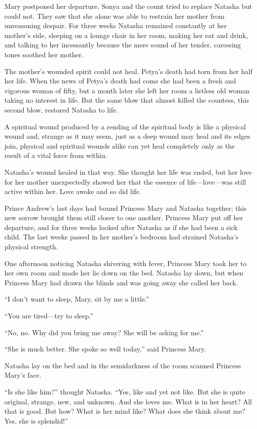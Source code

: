  Mary postponed her departure. Sonya and the count tried
to replace Natasha but could not. They saw that she alone was
able to restrain her mother from unreasoning despair. For three
weeks Natasha remained constantly at her mother's side, sleeping
on a lounge chair in her room, making her eat and drink, and
talking to her incessantly because the mere sound of her tender,
caressing tones soothed her mother.

The mother's wounded spirit could not heal. Petya's death had
torn from her half her life. When the news of Petya's death had
come she had been a fresh and vigorous woman of fifty, but a
month later she left her room a listless old woman taking no
interest in life. But the same blow that almost killed the
countess, this second blow, restored Natasha to life.

A spiritual wound produced by a rending of the spiritual body is
like a physical wound and, strange as it may seem, just as a deep
wound may heal and its edges join, physical and spiritual wounds
alike can yet heal completely only as the result of a vital force
from within.

Natasha's wound healed in that way. She thought her life was
ended, but her love for her mother unexpectedly showed her that
the essence of life---love---was still active within her. Love
awoke and so did life.

Prince Andrew's last days had bound Princess Mary and Natasha
together; this new sorrow brought them still closer to one
another. Princess Mary put off her departure, and for three weeks
looked after Natasha as if she had been a sick child. The last
weeks passed in her mother's bedroom had strained Natasha's
physical strength.

One afternoon noticing Natasha shivering with fever, Princess
Mary took her to her own room and made her lie down on the
bed. Natasha lay down, but when Princess Mary had drawn the
blinds and was going away she called her back.

``I don't want to sleep, Mary, sit by me a little.''

``You are tired---try to sleep.''

``No, no. Why did you bring me away? She will be asking for me.''

``She is much better. She spoke so well today,'' said Princess
Mary.

Natasha lay on the bed and in the semidarkness of the room
scanned Princess Mary's face.

``Is she like him?'' thought Natasha. ``Yes, like and yet not
like. But she is quite original, strange, new, and unknown. And
she loves me. What is in her heart? All that is good. But how?
What is her mind like? What does she think about me? Yes, she is
splendid!''

